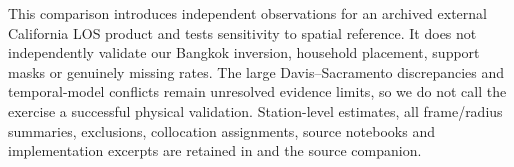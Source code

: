 This comparison introduces independent observations for an archived external California LOS product and tests sensitivity to spatial reference. It does not independently validate our Bangkok inversion, household placement, support masks or genuinely missing rates. The large Davis--Sacramento discrepancies and temporal-model conflicts remain unresolved evidence limits, so we do not call the exercise a successful physical validation. Station-level estimates, all frame/radius summaries, exclusions, collocation assignments, source notebooks and implementation excerpts are retained in  and the source companion.
